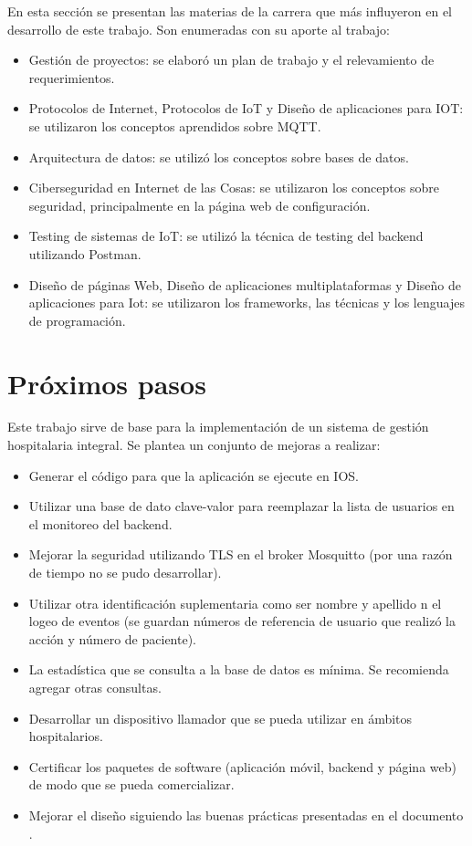 En esta sección se presentan las materias de la carrera que más influyeron en el desarrollo de este trabajo. Son enumeradas con su aporte al trabajo:

\begin{itemize}
\item Gestión de proyectos: se elaboró un plan de trabajo y el relevamiento de requerimientos.
\item Protocolos de Internet, Protocolos de IoT y Diseño de aplicaciones para IOT: se utilizaron los conceptos aprendidos sobre MQTT.
\item Arquitectura de datos: se utilizó los conceptos sobre bases de datos.
\item Ciberseguridad en Internet de las Cosas: se utilizaron los conceptos sobre seguridad, principalmente en la página web de configuración.
\item Testing de sistemas de IoT: se utilizó la técnica de testing del backend utilizando Postman.
\item Diseño de páginas Web, Diseño de aplicaciones multiplataformas y Diseño de aplicaciones para Iot: se utilizaron los frameworks, las técnicas y los lenguajes de programación.
\end{itemize}

\section{Próximos pasos}


Este trabajo sirve de base para la implementación de un sistema de gestión hospitalaria integral. Se plantea un conjunto de mejoras a realizar:

\begin{itemize}
\item Generar el código para que la aplicación se ejecute en IOS.
\item Utilizar una base de dato clave-valor para reemplazar la lista de usuarios en el monitoreo del backend.
\item Mejorar la seguridad utilizando TLS en el broker Mosquitto (por una razón de tiempo no se pudo desarrollar).
\item Utilizar otra identificación suplementaria como ser nombre y apellido n el logeo de eventos (se guardan números de referencia de usuario que realizó la acción y número de paciente). 
\item La estadística que se consulta a la base de datos es mínima. Se recomienda agregar otras consultas.
\item Desarrollar un dispositivo llamador que se pueda utilizar en ámbitos hospitalarios.
\item Certificar los paquetes de software (aplicación móvil, backend y página web) de modo que se pueda comercializar.
\item Mejorar el diseño siguiendo las buenas prácticas presentadas en el documento \citep{BOOK:3}.

\end{itemize}
